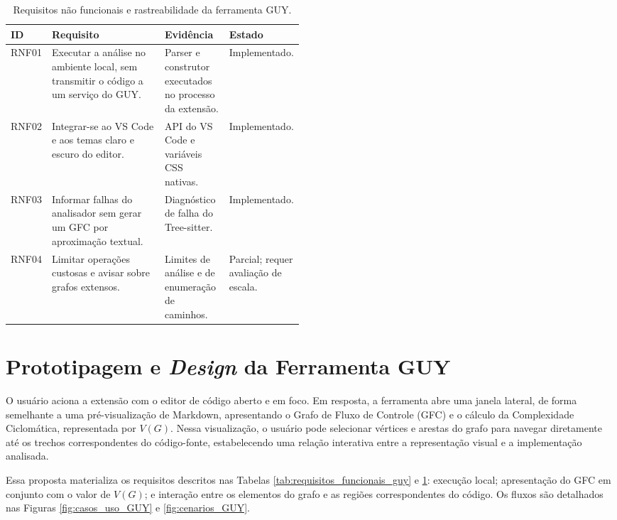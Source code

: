 \begin{table}[H]
    \centering
    \small
    \caption{Requisitos não funcionais e rastreabilidade da ferramenta GUY.}
    \begin{tabularx}{\linewidth}{p{0.10\linewidth} X p{0.22\linewidth} p{0.16\linewidth}}
        \hline
        \textbf{ID} & \textbf{Requisito} & \textbf{Evidência} & \textbf{Estado} \\ \hline
        RNF01 & Executar a análise no ambiente local, sem transmitir o código a um serviço do GUY. & Parser e construtor executados no processo da extensão. & Implementado. \\ \hline
        RNF02 & Integrar-se ao VS Code e aos temas claro e escuro do editor. & API do VS Code e variáveis CSS nativas. & Implementado. \\ \hline
        RNF03 & Informar falhas do analisador sem gerar um GFC por aproximação textual. & Diagnóstico de falha do Tree-sitter. & Implementado. \\ \hline
        RNF04 & Limitar operações custosas e avisar sobre grafos extensos. & Limites de análise e de enumeração de caminhos. & Parcial; requer avaliação de escala. \\ \hline
    \end{tabularx}
    \label{tab:requisitos_nao_funcionais_guy}
\end{table}

\section{Prototipagem e \textit{Design} da Ferramenta GUY}

O usuário aciona a extensão com o editor de código aberto e em foco. Em resposta, a ferramenta abre uma janela lateral, de forma semelhante a uma pré-visualização de Markdown, apresentando o Grafo de Fluxo de Controle (GFC) e o cálculo da Complexidade Ciclomática, representada por \(V(G)\).
Nessa visualização, o usuário pode selecionar vértices e arestas do grafo para navegar diretamente até os trechos correspondentes do código-fonte, estabelecendo uma relação interativa entre a representação visual e a implementação analisada.

Essa proposta materializa os requisitos descritos nas Tabelas \ref{tab:requisitos_funcionais_guy} e \ref{tab:requisitos_nao_funcionais_guy}: execução local; apresentação do GFC em conjunto com o valor de \(V(G)\); e interação entre os elementos do grafo e as regiões correspondentes do código. Os fluxos são detalhados nas Figuras \ref{fig:casos_uso_GUY} e \ref{fig:cenarios_GUY}.


